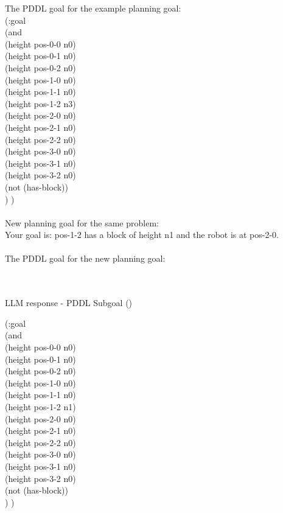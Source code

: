 \begin{tcolorbox}[redbox]
\begin{minipage}{0.95\columnwidth}
The PDDL goal for the example planning goal:   \\
(:goal \\
(and \\
    (height pos-0-0 n0) \\
    (height pos-0-1 n0) \\
    (height pos-0-2 n0) \\
    (height pos-1-0 n0) \\
    (height pos-1-1 n0) \\
    (height pos-1-2 n3) \\
    (height pos-2-0 n0) \\
    (height pos-2-1 n0) \\
    (height pos-2-2 n0) \\
    (height pos-3-0 n0) \\
    (height pos-3-1 n0) \\
    (height pos-3-2 n0) \\
    (not (has-block)) \\
)
) 
 \\ \\

New planning goal for the same problem: \\
Your goal is: pos-1-2 has a block of height n1 and the robot is at pos-2-0. 
 \\  \\
The PDDL goal for the new planning goal:
\end{minipage}
\end{tcolorbox} \\ \\
LLM response - PDDL Subgoal (\termes) \\
\begin{tcolorbox}[greenbox]
\begin{minipage}{0.95\columnwidth}
(:goal \\
(and \\
    (height pos-0-0 n0) \\
    (height pos-0-1 n0) \\
    (height pos-0-2 n0) \\
    (height pos-1-0 n0) \\
    (height pos-1-1 n0) \\
    (height pos-1-2 n1) \\
    (height pos-2-0 n0) \\
    (height pos-2-1 n0) \\
    (height pos-2-2 n0) \\
    (height pos-3-0 n0) \\
    (height pos-3-1 n0) \\
    (height pos-3-2 n0) \\
    (not (has-block)) \\
)
)
\end{minipage}
\end{tcolorbox} \\ \\
